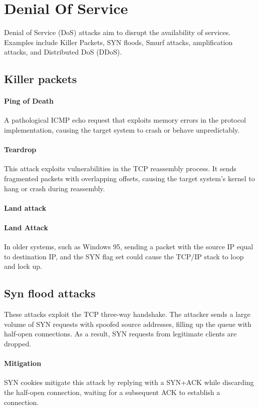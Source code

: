 \section{Denial Of Service}

Denial of Service (DoS) attacks aim to disrupt the availability of services. 
Examples include Killer Packets, SYN floods, Smurf attacks, amplification attacks, and Distributed DoS (DDoS).

\subsection{Killer packets}
\paragraph*{Ping of Death}
A pathological ICMP echo request that exploits memory errors in the protocol implementation, causing the target system to crash or behave unpredictably.

\paragraph*{Teardrop}
This attack exploits vulnerabilities in the TCP reassembly process.
It sends fragmented packets with overlapping offsets, causing the target system's kernel to hang or crash during reassembly.

\paragraph*{Land attack}
\paragraph*{Land Attack}
In older systems, such as Windows 95, sending a packet with the source IP equal to destination IP, and the SYN flag set could cause the TCP/IP stack to loop and lock up.

\subsection{Syn flood attacks}
These attacks exploit the TCP three-way handshake. 
The attacker sends a large volume of SYN requests with spoofed source addresses, filling up the queue with half-open connections. 
As a result, SYN requests from legitimate clients are dropped.
\paragraph*{Mitigation}
SYN cookies mitigate this attack by replying with a SYN+ACK while discarding the half-open connection, waiting for a subsequent ACK to establish a connection.

